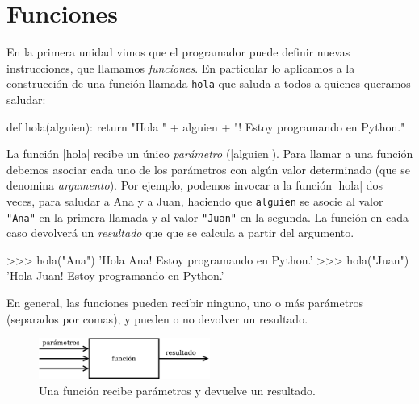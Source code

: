 
%

\chapter[Funciones]{Funciones}
\label{chapter:funciones}

En la primera unidad vimos que el programador puede definir nuevas
instrucciones, que llamamos {\it funciones}. En particular lo aplicamos a la
construcción de una función llamada \lstinline+hola+ que saluda a todos a
quienes queramos saludar:

\begin{codigo-python-sn}
def hola(alguien):
	return "Hola " + alguien + "! Estoy programando en Python."
\end{codigo-python-sn}

La función |hola| recibe un único {\it parámetro} (|alguien|). Para llamar a
una función debemos asociar cada uno de los parámetros con algún valor
determinado (que se denomina {\it argumento}). Por ejemplo, podemos invocar a
la función |hola| dos veces, para saludar a Ana y a Juan, haciendo que
\lstinline+alguien+ se asocie al valor \lstinline!"Ana"! en la primera llamada
y al valor \lstinline!"Juan"! en la segunda. La función en cada caso devolverá
un {\it resultado} que que se calcula a partir del argumento.

\begin{codigo-python-sn}
>>> hola("Ana")
'Hola Ana! Estoy programando en Python.'
>>> hola("Juan")
'Hola Juan! Estoy programando en Python.'
\end{codigo-python-sn}

En general, las funciones pueden recibir ninguno, uno o más parámetros
(separados por comas), y pueden o no devolver un resultado.

\begin{figure}[ht]
\caption{Una función recibe parámetros y devuelve un resultado.}
\begin{center}
\includegraphics[width=0.5\textwidth]{graficos/funcion}
\end{center}
\end{figure}

